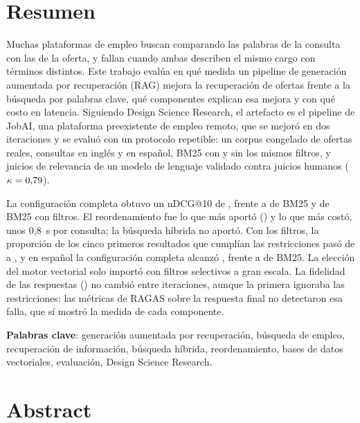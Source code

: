 \section*{Resumen}

Muchas plataformas de empleo buscan comparando las palabras de la consulta con las de la oferta, y fallan cuando ambas describen el mismo cargo con términos distintos. Este trabajo evalúa en qué medida un pipeline de generación aumentada por recuperación (RAG) mejora la recuperación de ofertas frente a la búsqueda por palabras clave, qué componentes explican esa mejora y con qué costo en latencia. Siguiendo Design Science Research, el artefacto es el pipeline de JobAI, una plataforma preexistente de empleo remoto, que se mejoró en dos iteraciones y se evaluó con un protocolo repetible: un corpus congelado de \cOfertas{} ofertas reales, \cConsultasPrueba{} consultas en inglés y en español, BM25 con y sin los mismos filtros, y juicios de relevancia de un modelo de lenguaje validado contra juicios humanos ($\kappa = 0{,}79$).

La configuración completa obtuvo un nDCG@10 de \cNdcgCompletaDos, frente a \cNdcgBMDos{} de BM25 y \cNdcgBMFiltrosDos{} de BM25 con filtros. El reordenamiento fue lo que más aportó (\cDifReord) y lo que más costó, unos 0,8~s por consulta; la búsqueda híbrida no aportó. Con los filtros, la proporción de los cinco primeros resultados que cumplían las restricciones pasó de \cCumplDensoDos{} a \cCumplFiltrosDos, y en español la configuración completa alcanzó \cNdcgCompletaEsDos, frente a \cNdcgBMEsDos{} de BM25. La elección del motor vectorial solo importó con filtros selectivos a gran escala. La fidelidad de las respuestas (\cFidelidadDos) no cambió entre iteraciones, aunque la primera ignoraba las restricciones: las métricas de RAGAS sobre la respuesta final no detectaron esa falla, que sí mostró la medida de cada componente.

\textbf{Palabras clave}: generación aumentada por recuperación, búsqueda de empleo, recuperación de información, búsqueda híbrida, reordenamiento, bases de datos vectoriales, evaluación, Design Science Research.

\newpage
\section*{Abstract}

